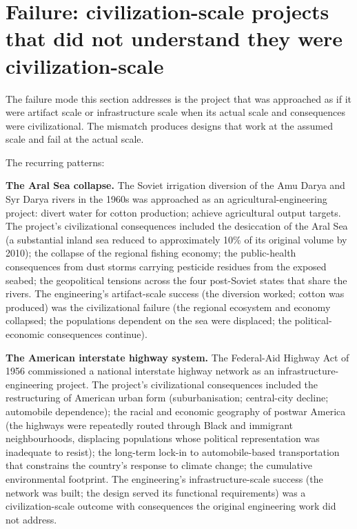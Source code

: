 \section{Failure: civilization-scale projects that did not understand they were civilization-scale}

The failure mode this section addresses is the project that was approached as if it were artifact scale or infrastructure scale when its actual scale and consequences were civilizational. The mismatch produces designs that work at the assumed scale and fail at the actual scale.

The recurring patterns:

\textbf{The Aral Sea collapse.} The Soviet irrigation diversion of the Amu Darya and Syr Darya rivers in the 1960s was approached as an agricultural-engineering project: divert water for cotton production; achieve agricultural output targets. The project's civilizational consequences included the desiccation of the Aral Sea (a substantial inland sea reduced to approximately 10\% of its original volume by 2010); the collapse of the regional fishing economy; the public-health consequences from dust storms carrying pesticide residues from the exposed seabed; the geopolitical tensions across the four post-Soviet states that share the rivers. The engineering's artifact-scale success (the diversion worked; cotton was produced) was the civilizational failure (the regional ecosystem and economy collapsed; the populations dependent on the sea were displaced; the political-economic consequences continue).

\textbf{The American interstate highway system.} The Federal-Aid Highway Act of 1956 commissioned a national interstate highway network as an infrastructure-engineering project. The project's civilizational consequences included the restructuring of American urban form (suburbanisation; central-city decline; automobile dependence); the racial and economic geography of postwar America (the highways were repeatedly routed through Black and immigrant neighbourhoods, displacing populations whose political representation was inadequate to resist); the long-term lock-in to automobile-based transportation that constrains the country's response to climate change; the cumulative environmental footprint. The engineering's infrastructure-scale success (the network was built; the design served its functional requirements) was a civilization-scale outcome with consequences the original engineering work did not address.

